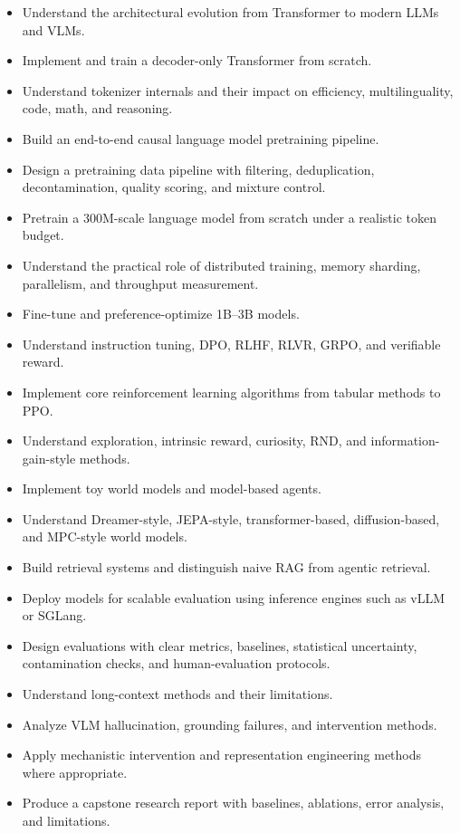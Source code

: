 \documentclass[11pt]{article}
\begin{document}
\begin{itemize}
    \item Understand the architectural evolution from Transformer to modern LLMs and VLMs.
    \item Implement and train a decoder-only Transformer from scratch.
    \item Understand tokenizer internals and their impact on efficiency, multilinguality, code, math, and reasoning.
    \item Build an end-to-end causal language model pretraining pipeline.
    \item Design a pretraining data pipeline with filtering, deduplication, decontamination, quality scoring, and mixture control.
    \item Pretrain a 300M-scale language model from scratch under a realistic token budget.
    \item Understand the practical role of distributed training, memory sharding, parallelism, and throughput measurement.
    \item Fine-tune and preference-optimize 1B--3B models.
    \item Understand instruction tuning, DPO, RLHF, RLVR, GRPO, and verifiable reward.
    \item Implement core reinforcement learning algorithms from tabular methods to PPO.
    \item Understand exploration, intrinsic reward, curiosity, RND, and information-gain-style methods.
    \item Implement toy world models and model-based agents.
    \item Understand Dreamer-style, JEPA-style, transformer-based, diffusion-based, and MPC-style world models.
    \item Build retrieval systems and distinguish naive RAG from agentic retrieval.
    \item Deploy models for scalable evaluation using inference engines such as vLLM or SGLang.
    \item Design evaluations with clear metrics, baselines, statistical uncertainty, contamination checks, and human-evaluation protocols.
    \item Understand long-context methods and their limitations.
    \item Analyze VLM hallucination, grounding failures, and intervention methods.
    \item Apply mechanistic intervention and representation engineering methods where appropriate.
    \item Produce a capstone research report with baselines, ablations, error analysis, and limitations.
\end{itemize}
\end{document}

